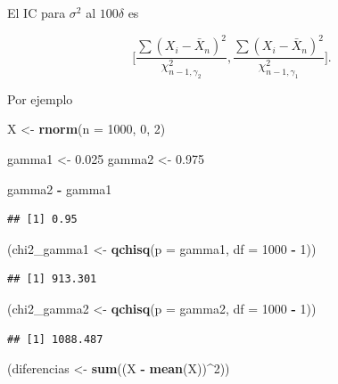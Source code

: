 \documentclass[
  12pt,
]{book}
\newenvironment{Shaded}{\begin{snugshade}}{\end{snugshade}}
\newcommand{\DataTypeTok}[1]{\textcolor[rgb]{0.13,0.29,0.53}{#1}}
\newcommand{\DecValTok}[1]{\textcolor[rgb]{0.00,0.00,0.81}{#1}}
\newcommand{\FloatTok}[1]{\textcolor[rgb]{0.00,0.00,0.81}{#1}}
\newcommand{\KeywordTok}[1]{\textcolor[rgb]{0.13,0.29,0.53}{\textbf{#1}}}
\newcommand{\NormalTok}[1]{#1}
\newcommand{\OperatorTok}[1]{\textcolor[rgb]{0.81,0.36,0.00}{\textbf{#1}}}
\newcommand{\StringTok}[1]{\textcolor[rgb]{0.31,0.60,0.02}{#1}}
\begin{document}
El IC para \(\sigma^2\) al \(100\delta\) es

\[ \Bigg[ \dfrac{\sum(X_i -\bar X_n) ^2}{\chi^2_{n-1,\gamma_2}}, \dfrac{\sum(X_i -\bar X_n)
^2}{\chi^2_{n-1,\gamma_1}}\Bigg].\]

Por ejemplo

\begin{Shaded}
\begin{Highlighting}[]
\NormalTok{X \textless{}{-}}\StringTok{ }\KeywordTok{rnorm}\NormalTok{(}\DataTypeTok{n =} \DecValTok{1000}\NormalTok{, }\DecValTok{0}\NormalTok{, }\DecValTok{2}\NormalTok{)}

\NormalTok{gamma1 \textless{}{-}}\StringTok{ }\FloatTok{0.025}
\NormalTok{gamma2 \textless{}{-}}\StringTok{ }\FloatTok{0.975}

\NormalTok{gamma2 }\OperatorTok{{-}}\StringTok{ }\NormalTok{gamma1}
\end{Highlighting}
\end{Shaded}

\begin{verbatim}
## [1] 0.95
\end{verbatim}

\begin{Shaded}
\begin{Highlighting}[]
\NormalTok{(chi2\_gamma1 \textless{}{-}}\StringTok{ }\KeywordTok{qchisq}\NormalTok{(}\DataTypeTok{p =}\NormalTok{ gamma1, }\DataTypeTok{df =} \DecValTok{1000} \OperatorTok{{-}}\StringTok{ }\DecValTok{1}\NormalTok{))}
\end{Highlighting}
\end{Shaded}

\begin{verbatim}
## [1] 913.301
\end{verbatim}

\begin{Shaded}
\begin{Highlighting}[]
\NormalTok{(chi2\_gamma2 \textless{}{-}}\StringTok{ }\KeywordTok{qchisq}\NormalTok{(}\DataTypeTok{p =}\NormalTok{ gamma2, }\DataTypeTok{df =} \DecValTok{1000} \OperatorTok{{-}}\StringTok{ }\DecValTok{1}\NormalTok{))}
\end{Highlighting}
\end{Shaded}

\begin{verbatim}
## [1] 1088.487
\end{verbatim}

\begin{Shaded}
\begin{Highlighting}[]
\NormalTok{(diferencias \textless{}{-}}\StringTok{ }\KeywordTok{sum}\NormalTok{((X }\OperatorTok{{-}}\StringTok{ }\KeywordTok{mean}\NormalTok{(X))}\OperatorTok{\^{}}\DecValTok{2}\NormalTok{))}
\end{Highlighting}
\end{Shaded}
\end{document}
